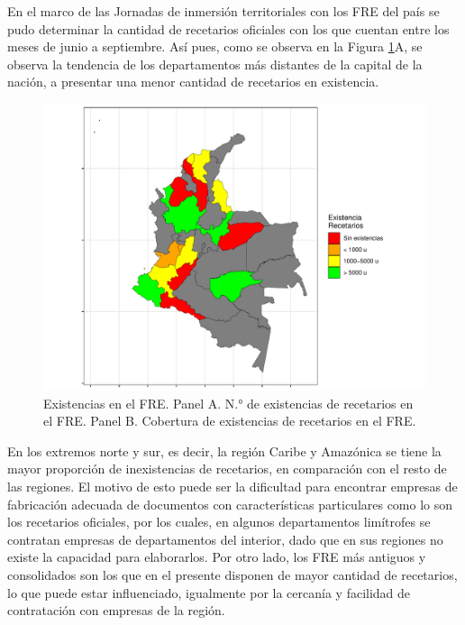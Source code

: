 \documentclass[
]{book}
\begin{document}
En el marco de las Jornadas de inmersión territoriales con los FRE del país se pudo determinar la cantidad de recetarios oficiales con los que cuentan entre los meses de junio a septiembre. Así pues, como se observa en la Figura \ref{fig:existenciasRecetarios}A, se observa la tendencia de los departamentos más distantes de la capital de la nación, a presentar una menor cantidad de recetarios en existencia.

\begin{figure}

{\centering \includegraphics[width=1\linewidth]{InformeFinal_files/figure-latex/existenciasRecetarios-1} 

}

\caption{Existencias en el FRE. Panel A. N.° de existencias de recetarios en el FRE. Panel B. Cobertura de existencias de recetarios en el FRE.}\label{fig:existenciasRecetarios}
\end{figure}

En los extremos norte y sur, es decir, la región Caribe y Amazónica se tiene la mayor proporción de inexistencias de recetarios, en comparación con el resto de las regiones. El motivo de esto puede ser la dificultad para encontrar empresas de fabricación adecuada de documentos con características particulares como lo son los recetarios oficiales, por los cuales, en algunos departamentos limítrofes se contratan empresas de departamentos del interior, dado que en sus regiones no existe la capacidad para elaborarlos. Por otro lado, los FRE más antiguos y consolidados son los que en el presente disponen de mayor cantidad de recetarios, lo que puede estar influenciado, igualmente por la cercanía y facilidad de contratación con empresas de la región.
\end{document}
